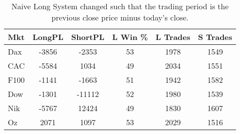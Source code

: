 \begin{table}[ht]
\centering
\caption[Naive Long System - Close to Close]{Naive Long System changed such that the trading period is the previous close price minus today's close.} 
\label{tab:sar_results}
\begin{tabular}{lccccc}
  \toprule Mkt & LongPL & ShortPL & L Win \% & L Trades & S Trades \\ 
  \midrule Dax & -3856 & -2353 & 53 & 1978 & 1549 \\ 
  CAC & -5584 & 1034 & 49 & 2034 & 1551 \\ 
  F100 & -1141 & -1663 & 51 & 1942 & 1582 \\ 
  Dow & -1301 & -11112 & 52 & 1980 & 1539 \\ 
  Nik & -5767 & 12424 & 49 & 1830 & 1607 \\ 
  Oz & 2071 & 1097 & 53 & 2029 & 1516 \\ 
   \bottomrule \end{tabular}
\end{table}
